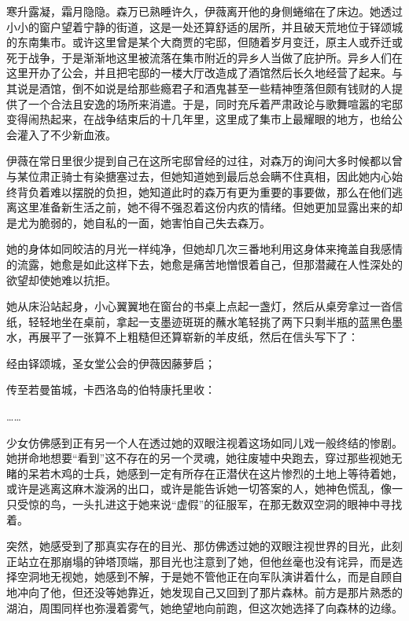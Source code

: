 寒升露凝，霜月隐隐。森万已熟睡许久，伊薇离开他的身侧蜷缩在了床边。她透过小小的窗户望着宁静的街道，这是一处还算舒适的居所，并且破天荒地位于铎颂城的东南集市。或许这里曾是某个大商贾的宅邸，但随着岁月变迁，原主人或乔迁或死于战争，于是渐渐地这里被流落在集市附近的异乡人当做了庇护所。异乡人们在这里开办了公会，并且把宅邸的一楼大厅改造成了酒馆然后长久地经营了起来。与其说是酒馆，倒不如说是给那些瘾君子和酒鬼甚至一些精神堕落但颇有钱财的人提供了一个合法且安逸的场所来消遣。于是，同时充斥着严肃政论与歌舞喧嚣的宅邸变得闹热起来，在战争结束后的十几年里，这里成了集市上最耀眼的地方，也给公会灌入了不少新血液。

伊薇在常日里很少提到自己在这所宅邸曾经的过往，对森万的询问大多时候都以曾与某位肃正骑士有染搪塞过去，但她知道她到最后总会瞒不住真相，因此她内心始终背负着难以摆脱的负担，她知道此时的森万有更为重要的事要做，那么在他们逃离这里准备新生活之前，她不得不强忍着这份内疚的情绪。但她更加显露出来的却是尤为脆弱的，她自私的一面，她害怕自己失去森万。

她的身体如同皎洁的月光一样纯净，但她却几次三番地利用这身体来掩盖自我感情的流露，她愈是如此这样下去，她愈是痛苦地憎恨着自己，但那潜藏在人性深处的欲望却使她难以抗拒。

她从床沿站起身，小心翼翼地在窗台的书桌上点起一盏灯，然后从桌旁拿过一沓信纸，轻轻地坐在桌前，拿起一支墨迹斑斑的蘸水笔轻挑了两下只剩半瓶的蓝黑色墨水，再展平了一张算不上粗糙但还算崭新的羊皮纸，然后在信头写下了：

经由铎颂城，圣女堂公会的伊薇因藤萝启；

传至若曼笛城，卡西洛岛的伯特康托里收：

……

少女仿佛感到正有另一个人在透过她的双眼注视着这场如同儿戏一般终结的惨剧。她拼命地想要“看到”这不存在的另一个灵魂，她往废墟中央跑去，穿过那些视她无睹的呆若木鸡的士兵，她感到一定有所存在正潜伏在这片惨烈的土地上等待着她，或许是逃离这麻木漩涡的出口，或许是能告诉她一切答案的人，她神色慌乱，像一只受惊的鸟，一头扎进这于她来说“虚假”的征服军，在那无数双空洞的眼神中寻找着。

突然，她感受到了那真实存在的目光、那仿佛透过她的双眼注视世界的目光，此刻正站立在那崩塌的钟塔顶端，那目光也注意到了她，但他丝毫也没有诧异，而是选择空洞地无视她，她感到不解，于是她不管他正在向军队演讲着什么，而是自顾自地冲向了他，但还没等她靠近，她发现自己又回到了那片森林。前方是那片熟悉的湖泊，周围同样也弥漫着雾气，她绝望地向前跑，但这次她选择了向森林的边缘。